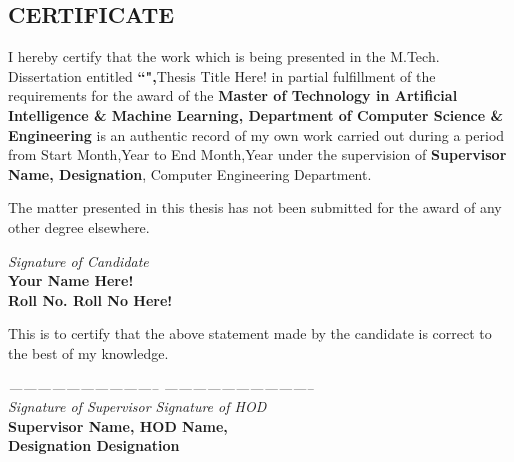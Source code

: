 \documentclass[12pt,a4paper]{report}
\begin{document}
\begin{center}
	\section*{CERTIFICATE}
	\noindent{\rule{\textwidth}{1.5pt}}
\end{center}
I hereby certify that the work which is being presented in the M.Tech. Dissertation entitled  \textbf{``",}Thesis Title Here! in partial fulfillment of the requirements for the award of the \textbf{Master of Technology in Artificial Intelligence \& Machine Learning, Department of Computer Science \& Engineering} is an authentic record of my own work carried out during a period from Start Month,Year to End Month,Year under the supervision of \textbf{Supervisor Name, Designation}, Computer Engineering Department.
\vspace{30pt}
\par
The matter presented in this thesis has not been submitted for the award of any other degree elsewhere.
\begin{flushright}
	\textit{Signature of Candidate \\}
	\textbf{Your Name Here!\\ Roll No. Roll No Here!\\}
\end{flushright}
\vspace{30pt}

\par
This is to certify that the above statement made by the candidate is correct to the best of my knowledge.
\vspace{20pt}




\begin{flushleft}
\textit{-------------------------------- \hfill --------------------------------\\}
	\textit{Signature of Supervisor \hfill Signature of HOD\\}
	\textbf{Supervisor Name, \hfill HOD Name,\\  Designation \hfill  Designation}
\end{flushleft}
\end{document}
